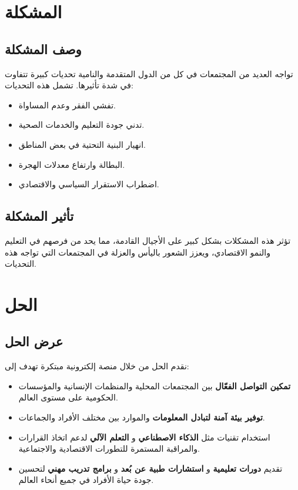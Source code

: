 \documentclass[12pt]{article}
\begin{document}
\section {\textcolor{sectionColor}{المشكلة}}
\subsection*{\textcolor{sectionColor}{وصف المشكلة}}
تواجه العديد من المجتمعات في كل من الدول المتقدمة والنامية تحديات كبيرة تتفاوت في شدة تأثيرها. تشمل هذه التحديات:
\begin{itemize}
    \item تفشي الفقر وعدم المساواة.
    \item تدني جودة التعليم والخدمات الصحية.
    \item انهيار البنية التحتية في بعض المناطق.
    \item البطالة وارتفاع معدلات الهجرة.
    \item اضطراب الاستقرار السياسي والاقتصادي.
\end{itemize}

\subsection*{\textcolor{sectionColor}{تأثير المشكلة}}
تؤثر هذه المشكلات بشكل كبير على الأجيال القادمة، مما يحد من فرصهم في التعليم والنمو الاقتصادي، ويعزز الشعور باليأس والعزلة في المجتمعات التي تواجه هذه التحديات.

\section {\textcolor{sectionColor}{الحل}}
\subsection*{\textcolor{sectionColor}{عرض الحل}}
نقدم الحل من خلال منصة إلكترونية مبتكرة تهدف إلى:
\begin{itemize}
    \item \textbf{تمكين التواصل الفعّال} بين المجتمعات المحلية والمنظمات الإنسانية والمؤسسات الحكومية على مستوى العالم.
    \item \textbf{توفير بيئة آمنة لتبادل المعلومات} والموارد بين مختلف الأفراد والجماعات.
    \item استخدام تقنيات مثل \textbf{الذكاء الاصطناعي} و \textbf{التعلم الآلي} لدعم اتخاذ القرارات والمراقبة المستمرة للتطورات الاقتصادية والاجتماعية.
    \item تقديم \textbf{دورات تعليمية} و \textbf{استشارات طبية عن بُعد} و \textbf{برامج تدريب مهني} لتحسين جودة حياة الأفراد في جميع أنحاء العالم.
\end{itemize}
\end{document}

